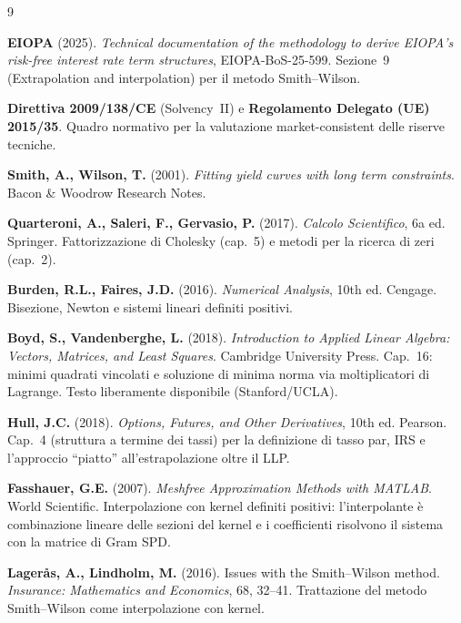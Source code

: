 \documentclass[11pt,a4paper]{article}
\theoremstyle{plain}
\theoremstyle{definition}
\theoremstyle{remark}
\begin{document}
\renewcommand{\refname}{Riferimenti bibliografici}
\begin{thebibliography}{9}

  \textbf{EIOPA} (2025).
  \textit{Technical documentation of the methodology to derive EIOPA's risk-free interest rate
  term structures}, EIOPA-BoS-25-599.
  Sezione~9 (Extrapolation and interpolation) per il metodo Smith--Wilson.

  \textbf{Direttiva 2009/138/CE} (Solvency~II) e
  \textbf{Regolamento Delegato (UE) 2015/35}.
  Quadro normativo per la valutazione market-consistent delle riserve tecniche.

  \textbf{Smith, A., Wilson, T.} (2001).
  \textit{Fitting yield curves with long term constraints}.
  Bacon \& Woodrow Research Notes.

  \textbf{Quarteroni, A., Saleri, F., Gervasio, P.} (2017).
  \textit{Calcolo Scientifico}, 6a ed. Springer.
  Fattorizzazione di Cholesky (cap.~5) e metodi per la ricerca di zeri (cap.~2).

  \textbf{Burden, R.L., Faires, J.D.} (2016).
  \textit{Numerical Analysis}, 10th ed. Cengage.
  Bisezione, Newton e sistemi lineari definiti positivi.

  \textbf{Boyd, S., Vandenberghe, L.} (2018).
  \textit{Introduction to Applied Linear Algebra: Vectors, Matrices, and Least Squares}.
  Cambridge University Press.
  Cap.~16: minimi quadrati vincolati e soluzione di minima norma via moltiplicatori di
  Lagrange. Testo liberamente disponibile (Stanford/UCLA).

  \textbf{Hull, J.C.} (2018).
  \textit{Options, Futures, and Other Derivatives}, 10th ed. Pearson.
  Cap.~4 (struttura a termine dei tassi) per la definizione di tasso par, IRS e
  l'approccio ``piatto'' all'estrapolazione oltre il LLP.

  \textbf{Fasshauer, G.E.} (2007).
  \textit{Meshfree Approximation Methods with MATLAB}. World Scientific.
  Interpolazione con kernel definiti positivi: l'interpolante \`e combinazione lineare delle
  sezioni del kernel e i coefficienti risolvono il sistema con la matrice di Gram SPD.

  \textbf{Lager\aa s, A., Lindholm, M.} (2016).
  Issues with the Smith--Wilson method.
  \textit{Insurance: Mathematics and Economics}, 68, 32--41.
  Trattazione del metodo Smith--Wilson come interpolazione con kernel.

\end{thebibliography}
\end{document}
